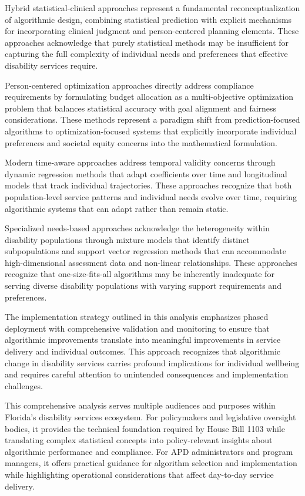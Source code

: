 \documentclass[12pt]{article}
\begin{document}
Hybrid statistical-clinical approaches represent a fundamental reconceptualization of algorithmic design, combining statistical prediction with explicit mechanisms for incorporating clinical judgment and person-centered planning elements. These approaches acknowledge that purely statistical methods may be insufficient for capturing the full complexity of individual needs and preferences that effective disability services require.

Person-centered optimization approaches directly address compliance requirements by formulating budget allocation as a multi-objective optimization problem that balances statistical accuracy with goal alignment and fairness considerations. These methods represent a paradigm shift from prediction-focused algorithms to optimization-focused systems that explicitly incorporate individual preferences and societal equity concerns into the mathematical formulation.

Modern time-aware approaches address temporal validity concerns through dynamic regression methods that adapt coefficients over time and longitudinal models that track individual trajectories. These approaches recognize that both population-level service patterns and individual needs evolve over time, requiring algorithmic systems that can adapt rather than remain static.

Specialized needs-based approaches acknowledge the heterogeneity within disability populations through mixture models that identify distinct subpopulations and support vector regression methods that can accommodate high-dimensional assessment data and non-linear relationships. These approaches recognize that one-size-fits-all algorithms may be inherently inadequate for serving diverse disability populations with varying support requirements and preferences.

The implementation strategy outlined in this analysis emphasizes phased deployment with comprehensive validation and monitoring to ensure that algorithmic improvements translate into meaningful improvements in service delivery and individual outcomes. This approach recognizes that algorithmic change in disability services carries profound implications for individual wellbeing and requires careful attention to unintended consequences and implementation challenges.

This comprehensive analysis serves multiple audiences and purposes within Florida's disability services ecosystem. For policymakers and legislative oversight bodies, it provides the technical foundation required by House Bill 1103 while translating complex statistical concepts into policy-relevant insights about algorithmic performance and compliance. For APD administrators and program managers, it offers practical guidance for algorithm selection and implementation while highlighting operational considerations that affect day-to-day service delivery.
\end{document}

